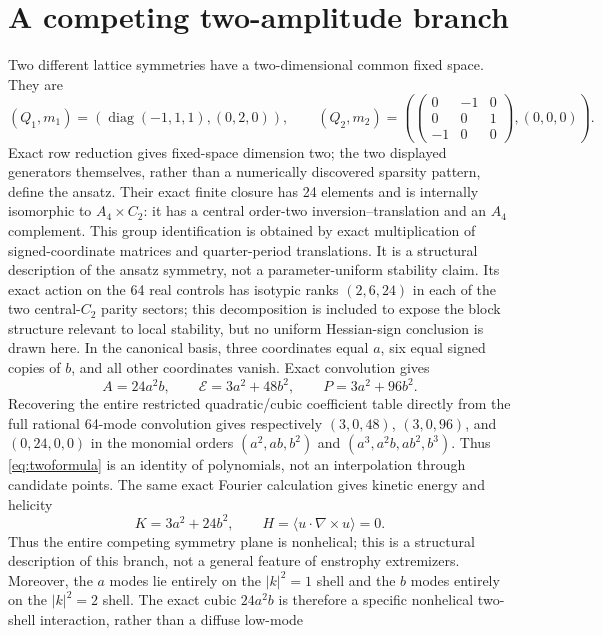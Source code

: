 \documentclass[11pt]{article}
\newcommand{\E}{\mathcal{E}}
\begin{document}
\section{A competing two-amplitude branch}
Two different lattice symmetries have a two-dimensional common fixed space.
They are
\[
 (Q_1,m_1)=\left(\operatorname{diag}(-1,1,1),(0,2,0)\right),\qquad
 (Q_2,m_2)=\left(
 \begin{pmatrix}0&-1&0\\0&0&1\\-1&0&0\end{pmatrix},(0,0,0)\right).
\]
Exact row reduction gives fixed-space dimension two; the two displayed
generators themselves, rather than a numerically discovered sparsity pattern,
define the ansatz.
Their exact finite closure has 24 elements and is internally isomorphic to
$A_4\times C_2$: it has a central order-two inversion--translation and an
$A_4$ complement. This group identification is obtained by exact multiplication
of signed-coordinate matrices and quarter-period translations. It is a
structural description of the ansatz symmetry, not a parameter-uniform
stability claim. Its exact action on the 64 real controls has isotypic ranks
$(2,6,24)$ in each of the two central-$C_2$ parity sectors; this decomposition
is included to expose the block structure relevant to local stability, but no
uniform Hessian-sign conclusion is drawn here.
In the canonical basis, three coordinates equal $a$, six equal signed copies
of $b$, and all other coordinates vanish.  Exact convolution gives
\begin{equation}\label{eq:twoformula}
A=24a^2b,\qquad \E=3a^2+48b^2,\qquad P=3a^2+96b^2.
\end{equation}
Recovering the entire restricted quadratic/cubic coefficient table directly
from the full rational 64-mode convolution gives respectively
$(3,0,48)$, $(3,0,96)$, and $(0,24,0,0)$ in the monomial orders
$(a^2,ab,b^2)$ and $(a^3,a^2b,ab^2,b^3)$. Thus \eqref{eq:twoformula} is an
identity of polynomials, not an interpolation through candidate points.
The same exact Fourier calculation gives kinetic energy and helicity
\[
 K=3a^2+24b^2,\qquad H=\langle u\cdot\nabla\times u\rangle=0.
\]
Thus the entire competing symmetry plane is nonhelical; this is a structural
description of this branch, not a general feature of enstrophy extremizers.
Moreover, the $a$ modes lie entirely on the $|k|^2=1$ shell and the $b$ modes
entirely on the $|k|^2=2$ shell. The exact cubic $24a^2b$ is therefore a
specific nonhelical two-shell interaction, rather than a diffuse low-mode
\end{document}
